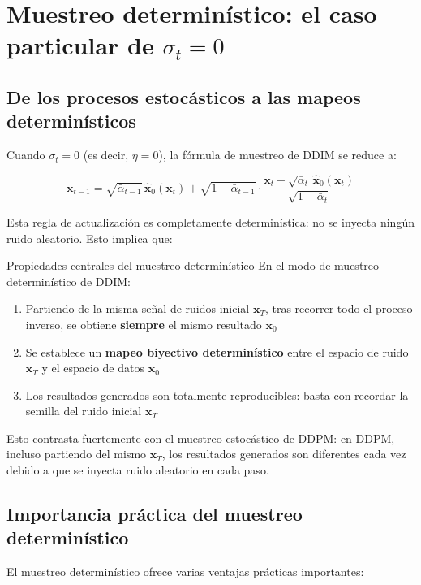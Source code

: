 \section{Muestreo determinístico: el caso particular de $\sigma_t = 0$}

\subsection{De los procesos estocásticos a las mapeos determinísticos}

Cuando $\sigma_t = 0$ (es decir, $\eta = 0$), la fórmula de muestreo de DDIM se reduce a:

$$
\mathbf{x}_{t-1} = \sqrt{\bar{\alpha}_{t-1}}\,\hat{\mathbf{x}}_0(\mathbf{x}_t) + \sqrt{1-\bar{\alpha}_{t-1}}\cdot\frac{\mathbf{x}_t - \sqrt{\bar{\alpha}_t}\,\hat{\mathbf{x}}_0(\mathbf{x}_t)}{\sqrt{1-\bar{\alpha}_t}}
$$

Esta regla de actualización es completamente determinística: no se inyecta ningún ruido aleatorio. Esto implica que:

\begin{importantbox}{Propiedades centrales del muestreo determinístico}
En el modo de muestreo determinístico de DDIM:
\begin{enumerate}
    \item Partiendo de la misma señal de ruidos inicial $\mathbf{x}_T$, tras recorrer todo el proceso inverso, se obtiene \textbf{siempre} el mismo resultado $\mathbf{x}_0$
    \item Se establece un \textbf{mapeo biyectivo determinístico} entre el espacio de ruido $\mathbf{x}_T$ y el espacio de datos $\mathbf{x}_0$
    \item Los resultados generados son totalmente reproducibles: basta con recordar la semilla del ruido inicial $\mathbf{x}_T$
\end{enumerate}
Esto contrasta fuertemente con el muestreo estocástico de DDPM: en DDPM, incluso partiendo del mismo $\mathbf{x}_T$, los resultados generados son diferentes cada vez debido a que se inyecta ruido aleatorio en cada paso.
\end{importantbox}

\subsection{Importancia práctica del muestreo determinístico}

El muestreo determinístico ofrece varias ventajas prácticas importantes:

